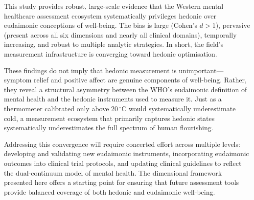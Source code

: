 \documentclass[12pt,a4paper]{article}
\begin{document}
This study provides robust, large-scale evidence that the Western mental healthcare assessment ecosystem systematically privileges hedonic over eudaimonic conceptions of well-being.
The bias is large (Cohen's $d > 1$), pervasive (present across all six dimensions and nearly all clinical domains), temporally increasing, and robust to multiple analytic strategies.
In short, the field's measurement infrastructure is converging toward hedonic optimisation.

These findings do not imply that hedonic measurement is unimportant---symptom relief and positive affect are genuine components of well-being.
Rather, they reveal a structural asymmetry between the WHO's eudaimonic definition of mental health and the hedonic instruments used to measure it.
Just as a thermometer calibrated only above $20\,^{\circ}$C would systematically underestimate cold, a measurement ecosystem that primarily captures hedonic states systematically underestimates the full spectrum of human flourishing.

Addressing this convergence will require concerted effort across multiple levels: developing and validating new eudaimonic instruments, incorporating eudaimonic outcomes into clinical trial protocols, and updating clinical guidelines to reflect the dual-continuum model of mental health.
The dimensional framework presented here offers a starting point for ensuring that future assessment tools provide balanced coverage of both hedonic and eudaimonic well-being.

\newpage

\end{document}
